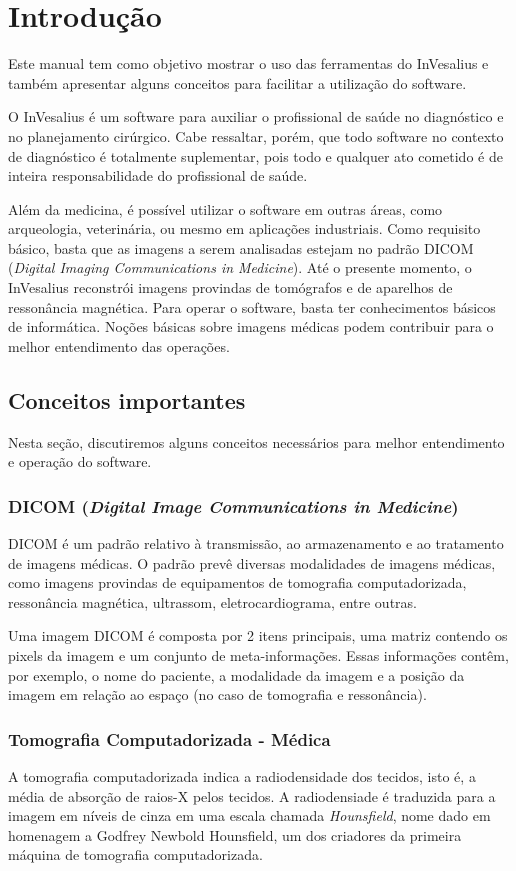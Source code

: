 \chapter{Introdução}
Este manual tem como objetivo mostrar o uso das ferramentas
do InVesalius e também apresentar alguns conceitos para facilitar
a utilização do software.

O InVesalius é um software para auxiliar o profissional
de saúde no diagnóstico	e no planejamento cirúrgico. Cabe
ressaltar, porém, que todo software no contexto de diagnóstico é
totalmente suplementar, pois todo e qualquer ato cometido é de
inteira responsabilidade do profissional de saúde.

Além da medicina, é possível utilizar o software em outras áreas, como
arqueologia, veterinária, ou mesmo em aplicações industriais.
Como requisito básico, basta que as imagens a serem analisadas
estejam no padrão DICOM (\textsl{Digital Imaging Communications in Medicine}).
Até o presente momento, o InVesalius reconstrói
imagens provindas de tomógrafos e de aparelhos de ressonância magnética.
Para operar o software, basta ter conhecimentos básicos de 
informática. Noções básicas sobre imagens médicas podem contribuir para o
melhor entendimento das operações.


\section{Conceitos importantes}
Nesta seção, discutiremos alguns conceitos necessários para melhor
entendimento e operação do software.


\subsection{DICOM (\textit{Digital Image Communications in Medicine})}			
DICOM é um padrão relativo à transmissão, ao armazenamento e
ao tratamento de imagens médicas. O padrão prevê diversas modalidades de imagens médicas,
como imagens provindas de equipamentos de tomografia computadorizada, ressonância magnética,
ultrassom, eletrocardiograma, entre outras.

Uma imagem DICOM é composta por 2 itens principais, uma matriz contendo os pixels da
imagem e um conjunto de meta-informações. Essas informações contêm, por exemplo, o nome
do paciente, a modalidade da imagem e a posição da imagem em relação ao espaço (no caso
de tomografia e ressonância).


\subsection{Tomografia Computadorizada - Médica}
A tomografia computadorizada indica a radiodensidade dos tecidos, isto é, a média de
absorção de raios-X pelos tecidos. A radiodensiade é traduzida para a imagem em níveis
de cinza em uma escala chamada \textit{Hounsfield}, nome dado em homenagem a Godfrey
Newbold Hounsfield, um dos criadores da primeira máquina de tomografia computadorizada.

